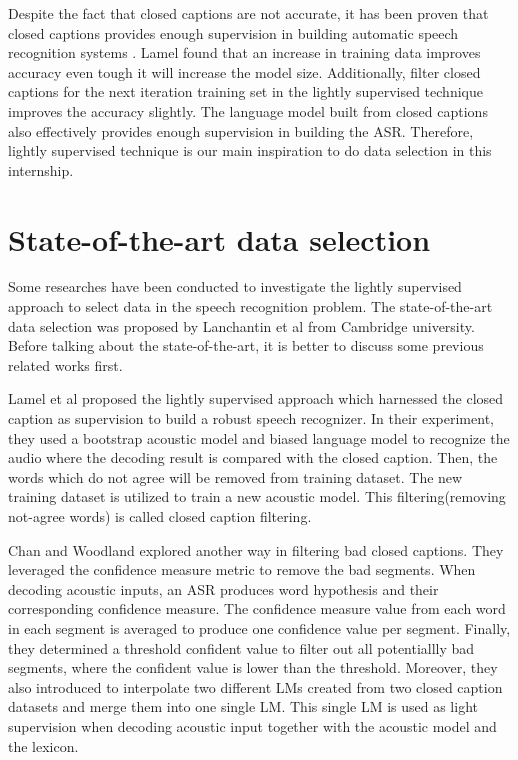 Despite the fact that closed captions are not accurate, it has been proven that closed captions provides enough supervision in building automatic speech recognition systems \cite{lightlySupervised}. Lamel found that an increase in training data improves accuracy even tough it will increase the model size. Additionally, filter closed captions for the next iteration training set in the lightly supervised technique improves the accuracy slightly. The language model built from closed captions also effectively provides enough supervision in building the ASR. Therefore, lightly supervised technique is our main inspiration to do data selection in this internship.

\section{State-of-the-art data selection}
\label{stateoftheart}
Some researches have been conducted to investigate the lightly supervised approach to select data in the speech recognition problem\cite{lightlySupervised,Lecouteux06imperfecttranscript,Chan,Mathias,Stolcke00anefficient}. The state-of-the-art data selection was proposed by  Lanchantin et al from Cambridge university\cite{Lanchantin2016}. Before talking about the state-of-the-art, it is better to discuss some previous related works first.

Lamel et al proposed the lightly supervised approach which harnessed the closed caption as supervision to build a robust speech recognizer\cite{lightlySupervised}. In their experiment, they used a bootstrap acoustic model and biased language model to recognize the audio where the decoding result is compared with the closed caption. Then, the words which do not agree will be removed from training dataset. The new training dataset is utilized to train a  new acoustic model. This filtering(removing not-agree words) is called closed caption filtering.

Chan and Woodland explored another way in filtering bad closed captions\cite{Chan}. They leveraged the confidence measure metric to remove the bad segments. When decoding acoustic inputs, an ASR produces word hypothesis and their corresponding confidence measure. The confidence measure value from each word in  each segment is averaged to produce one confidence value per segment. Finally, they determined a threshold confident value to filter out all potentiallly bad segments, where the confident value is lower than the threshold. Moreover, they also introduced to interpolate two different LMs created from two closed caption datasets and merge them into one single LM. This single LM is used as light supervision when decoding acoustic input together with the acoustic model and the lexicon.

